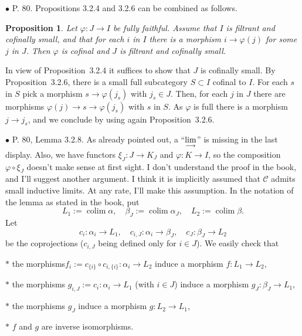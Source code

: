 \documentclass[12pt]{article}
\newtheorem{prop}[thm]{Proposition}
\theoremstyle{remark}%
\newcommand{\bu}{\bullet}
\newcommand{\n}{\noindent}
\newcommand{\C}{\mathcal C}
\newcommand{\p}{\varphi}
\newcommand{\pr}{Proposition}
\newcommand{\colim}{\operatornamewithlimits{\underset{\longrightarrow}{lim}}}
\DeclareMathOperator*{\coli}{colim}
\begin{document}

\n$\bu$ P. 80. \pr s 3.2.4 and 3.2.6 can be combined as follows. 

\begin{prop}\label{comb} 
Let $\p:J\to I$ be fully faithful. Assume that $I$ is filtrant and cofinally small, and that for each $i$ in $I$ there is a morphism $i\to\p(j)$ for some $j$ in $J$. Then $\p$ is cofinal and $J$ is filtrant and cofinally small. 
\end{prop} 

\n{\em Proof.} In view of \pr\ 3.2.4 it suffices to show that $J$ is cofinally small. By \pr\ 3.2.6, there is a small full subcategory $S\subset I$ cofinal to $I$. For each $s$ in $S$ pick a morphism $s\to\p(j_s)$ with $j_s\in J$. Then, for each $j$ in $J$ there are morphisms $\p(j)\to s\to\p(j_s)$ with $s$ in $S$. As $\p$ is full there is a morphism $j\to j_s$, and we conclude by using again \pr\ 3.2.6. 


\n$\bu$ P. 80, Lemma 3.2.8. As already pointed out, a ``$\displaystyle\colim$'' is missing in the last display. Also, we have functors $\xi_J:J\to K_J$ and $\varphi:K\to I$, so the composition $\varphi\circ\xi_J$ doesn't make sense at first sight. I don't understand the proof in the book, and I'll suggest another argument. I think it is implicitly assumed that $\C$ admits small inductive limits. At any rate, I'll make this assumption. In the notation of the lemma as stated in the book, put 
$$
L_1:=\coli\alpha,\quad
\beta_J:=\coli\alpha_J,\quad
L_2:=\coli\beta.
$$
Let 
$$
c_i:\alpha_i\to L_1,\quad 
c_{i,J}:\alpha_i\to\beta_J,\quad 
c_J:\beta_J\to L_2
$$
be the coprojections ($c_{i,J}$ being defined only for $i\in J$). We easily check that 

\n$*$ the morphisms$f_i:=c_{\{i\}}\circ c_{i,\{i\}}:\alpha_i\to L_2$ induce a morphism $f:L_1\to L_2$, 

\n$*$ the morphisms $g_{i,J}:=c_i:\alpha_i\to L_1$ (with $i\in J$) induce a morphism $g_J:\beta_J\to L_1$, 

\n$*$ the morphisms $g_J$ induce a morphism $g:L_2\to L_1$, 

\n$*$ $f$ and $g$ are inverse isomorphisms. 

\end{document}
